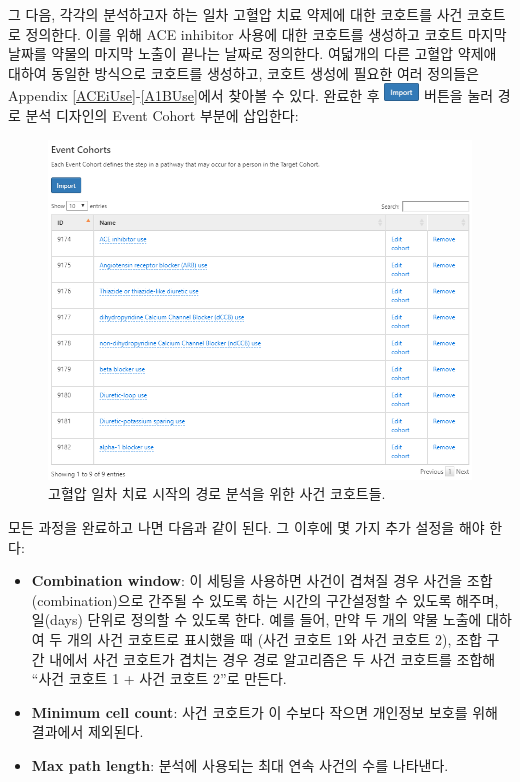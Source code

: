 \documentclass[11pt]{book}
\providecommand{\tightlist}{%
  \setlength{\itemsep}{0pt}\setlength{\parskip}{0pt}}
\theoremstyle{definition}
\theoremstyle{definition}
\theoremstyle{definition}
\theoremstyle{remark}
\begin{document}
그 다음, 각각의 분석하고자 하는 일차 고혈압 치료 약제에 대한 코호트를
사건 코호트로 정의한다. 이를 위해 ACE inhibitor 사용에 대한 코호트를
생성하고 코호트 마지막 날짜를 약물의 마지막 노출이 끝나는 날짜로
정의한다. 여덟개의 다른 고혈압 약제애 대하여 동일한 방식으로 코호트를
생성하고, 코호트 생성에 필요한 여러 정의들은 Appendix
\ref{ACEiUse}-\ref{A1BUse}에서 찾아볼 수 있다. 완료한 후
\includegraphics{images/Characterization/atlasImportButton.png} 버튼을
눌러 경로 분석 디자인의 Event Cohort 부분에 삽입한다:

\begin{figure}

{\centering \includegraphics[width=1\linewidth]{images/Characterization/atlasPathwaysEventCohorts} 

}

\caption{고혈압 일차 치료 시작의 경로 분석을 위한 사건 코호트들.}\label{fig:atlasPathwaysEventCohorts}
\end{figure}

모든 과정을 완료하고 나면 다음과 같이 된다. 그 이후에 몇 가지 추가
설정을 해야 한다:

\begin{itemize}
\tightlist
\item
  \textbf{Combination window}: 이 세팅을 사용하면 사건이 겹쳐질 경우
  사건을 조합(combination)으로 간주될 수 있도록 하는 시간의 구간설정할
  수 있도록 해주며, 일(days) 단위로 정의할 수 있도록 한다. 예를 들어,
  만약 두 개의 약물 노출에 대하여 두 개의 사건 코호트로 표시했을 때
  (사건 코호트 1와 사건 코호트 2), 조합 구간 내에서 사건 코호트가 겹치는
  경우 경로 알고리즘은 두 사건 코호트를 조합해 ``사건 코호트 1 + 사건
  코호트 2''로 만든다.
\item
  \textbf{Minimum cell count}: 사건 코호트가 이 수보다 작으면 개인정보
  보호를 위해 결과에서 제외된다.
\item
  \textbf{Max path length}: 분석에 사용되는 최대 연속 사건의 수를
  나타낸다.
\end{itemize}
\end{document}
